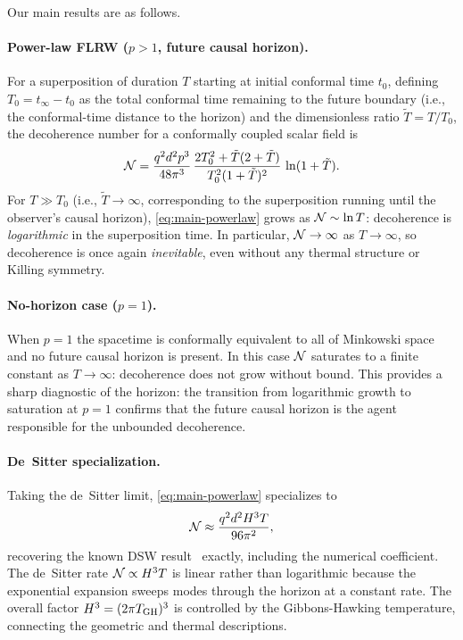 Our main results are as follows.

\paragraph{Power-law FLRW ($p > 1$, future causal horizon).}
For a superposition of duration $T$ starting at initial conformal time $t_{0}$,
defining $T_{0} = t_{\infty} - t_{0}$ as the total conformal time remaining to
the future boundary (i.e., the conformal-time distance to the horizon) and the
dimensionless ratio $\tilde{T} = T/T_{0}$, the decoherence number for a
conformally coupled scalar field is
\begin{equation}
  \mathcal{N}
  =
  \frac{q^{2}d^{2}p^{3}}{48\pi^{3}}\,
  \frac{2T_{0}^{2} + \tilde{T}(2 + \tilde{T})}
       {T_{0}^{2}(1 + \tilde{T})^{2}}\,
  \ln(1 + \tilde{T}) .
  \label{eq:main-powerlaw}
\end{equation}
For $T \gg T_{0}$ (i.e., $\tilde{T} \to \infty$, corresponding to the
superposition running until the observer's causal horizon), \cref{eq:main-powerlaw}
grows as $\mathcal{N} \sim \ln T$: decoherence is \emph{logarithmic} in the superposition
time.  In particular, $\mathcal{N} \to \infty$ as $T \to \infty$, so decoherence is
once again \emph{inevitable}, even without any thermal structure or Killing symmetry.

\paragraph{No-horizon case ($p = 1$).}
When $p = 1$ the spacetime is conformally equivalent to all of Minkowski space
and no future causal horizon is present.  In this case $\mathcal{N}$ saturates to a
finite constant as $T \to \infty$: decoherence does not grow without bound.
This provides a sharp diagnostic of the horizon: the transition from logarithmic
growth to saturation at $p = 1$ confirms that the future causal horizon is the
agent responsible for the unbounded decoherence.

\paragraph{De~Sitter specialization.}
Taking the de~Sitter limit, \cref{eq:main-powerlaw} specializes to
\begin{equation}
  \mathcal{N} \approx \frac{q^{2}d^{2}H^{3}T}{96\pi^{2}} ,
  \label{eq:main-desitter}
\end{equation}
recovering the known DSW result~\cite{Danielson:2022tdw,Li:2024} exactly,
including the numerical coefficient.  The de~Sitter rate $\mathcal{N} \propto H^{3}T$
is linear rather than logarithmic because the exponential expansion sweeps modes
through the horizon at a constant rate.  The overall factor $H^{3} = (2\pi T_{\rm
GH})^{3}$ is controlled by the Gibbons-Hawking temperature, connecting the
geometric and thermal descriptions.

